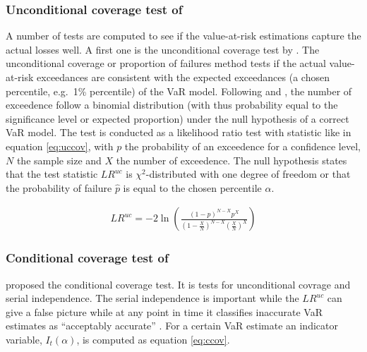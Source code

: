 \documentclass[a4paper, twoside]{templates/ociamthesis}
\begin{document}
\hypertarget{unconditional-coverage-test-of-kupiec1995}{%
\subsubsection{\texorpdfstring{Unconditional coverage test of \textcite{kupiec1995}}{Unconditional coverage test of @kupiec1995}}\label{unconditional-coverage-test-of-kupiec1995}}

A number of tests are computed to see if the value-at-risk estimations capture the actual losses well. A first one is the unconditional coverage test by \textcite{kupiec1995}. The unconditional coverage or proportion of failures method tests if the actual value-at-risk exceedances are consistent with the expected exceedances (a chosen percentile, e.g.~1\% percentile) of the VaR model. Following \textcite{kupiec1995} and \textcite{ghalanos2020}, the number of exceedence follow a binomial distribution (with thus probability equal to the significance level or expected proportion) under the null hypothesis of a correct VaR model. The test is conducted as a likelihood ratio test with statistic like in equation \eqref{eq:uccov}, with \(p\) the probability of an exceedence for a confidence level, \(N\) the sample size and \(X\) the number of exceedence. The null hypothesis states that the test statistic \(L R^{u c}\) is \(\chi^2\)-distributed with one degree of freedom or that the probability of failure \(\hat p\) is equal to the chosen percentile \(\alpha\).

\begin{align}
L R^{u c}=-2 \ln \left(\frac{(1-p)^{N-X} p^{X}}{\left(1-\frac{X}{N}\right)^{N-X}\left(\frac{X}{N}\right)^{X}}\right)
\label{eq:uccov}
\end{align}

\hypertarget{conditional-coverage-test-of-christoffersen2001}{%
\subsubsection{\texorpdfstring{Conditional coverage test of \textcite{christoffersen2001}}{Conditional coverage test of @christoffersen2001}}\label{conditional-coverage-test-of-christoffersen2001}}

\textcite{christoffersen2001} proposed the conditional coverage test. It is tests for unconditional covrage and serial independence. The serial independence is important while the \(L R^{u c}\) can give a false picture while at any point in time it classifies inaccurate VaR estimates as ``acceptably accurate'' \autocite{bali2007}. For a certain VaR estimate an indicator variable, \(I_t(\alpha)\), is computed as equation \eqref{eq:ccov}.
\end{document}
